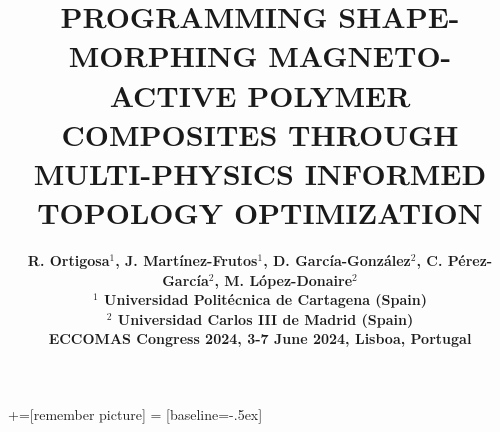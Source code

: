 \documentclass[compress,8pt,dvipsnames]{beamer}                              %
\title[ MultiSimO Lab]{
 	\textbf{\normalsize PROGRAMMING SHAPE-MORPHING MAGNETO-ACTIVE POLYMER COMPOSITES THROUGH MULTI-PHYSICS INFORMED TOPOLOGY OPTIMIZATION\\
 	}
 }
\author[Grant PID2022-141957OA-C22 funded by MCIN/AEI/10.13039/501100011033 and by ERDF A way of making Europe \hspace{0cm}]{  	\vspace{0cm}
 	\color{blue2}
 	{\normalsize \bf R. Ortigosa$^{1}$, J. Mart\'inez-Frutos$^{1}$, D. Garc\'ia-Gonz\'alez$^{2}$, C. P\'erez-Garc\'ia$^{2}$, M. L\'opez-Donaire$^{2}$} \normalsize \\\vspace{0.2cm}
 	{\normalsize \bf $^{1}$ Universidad Polit\'ecnica de Cartagena (Spain)\\
 	$^{2}$ Universidad Carlos III de Madrid (Spain)} \normalsize \\
 \vspace{1.5cm}
 	{\normalsize \bf ECCOMAS Congress 2024, 3-7 June 2024, Lisboa, Portugal} \normalsize \\\vspace{0.5cm}
 }
\date[6 Feb 2024]{   }
\newcommand{\logoslides}{
 \logo{} %

}
\newif\ifshowbi
\begin{document}
+=[remember picture]
 = [baseline=-.5ex]

   {	%
 	\begin{frame}
 		\titlepage
 	\end{frame}
 }

 
 
\normalsize

 
 
\logoslides

	\ifshowbi 
	
 
 
\fi
 
  







		\begin{frame}
 	\vspace{0.4cm}


\end{frame}
\end{document}
